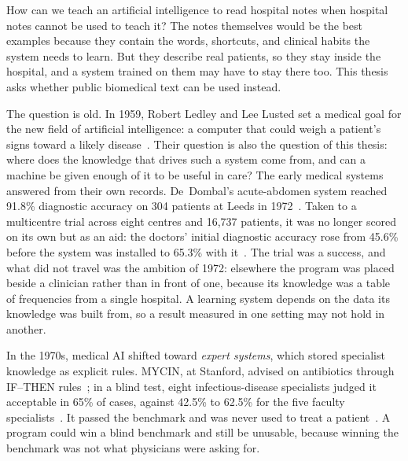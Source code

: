 

\noindent How can we teach an artificial intelligence to read hospital notes when hospital
notes cannot be used to teach it? The notes themselves would be
the best examples because they contain the words, shortcuts, and clinical habits
the system needs to learn. But they describe real patients, so they stay inside
the hospital, and a system trained on them may have to stay there too. This
thesis asks whether public biomedical text can be used instead.

The question is old. In 1959, Robert Ledley and Lee Lusted set a medical goal for
the new field of artificial intelligence: a computer that could weigh a patient's
signs toward a likely disease~\citep{ledley_lusted_1959}.
Their question is also
the question of this thesis: where does the knowledge that drives such a system
come from, and can a machine be given enough of it to be useful in care? The early
medical systems answered from their own records. De~Dombal's acute-abdomen system
reached 91.8\% diagnostic accuracy on 304 patients at Leeds in
1972~\citep{dedombal_1972}. Taken to a multicentre trial across eight centres and
16{,}737 patients, it was no longer scored on its own but as an aid: the doctors'
initial diagnostic accuracy rose from 45.6\% before the system was installed to
65.3\% with it~\citep{adams_1986}. The trial was a success, and what did not travel
was the ambition of 1972: elsewhere the program was placed beside a clinician
rather than in front of one, because its knowledge was a table of frequencies from
a single hospital. A learning system depends on the data
its knowledge was built from, so a result measured in one setting may not hold in
another.

In the 1970s, medical AI shifted toward \emph{expert systems}, which stored
specialist knowledge as explicit rules. MYCIN, at Stanford, advised on antibiotics
through IF--THEN rules~\citep{mycin_1975}; in a blind test, eight infectious-disease
specialists judged it acceptable in 65\% of cases, against 42.5\% to 62.5\% for the
five faculty specialists~\citep{mycin_eval_1979}. It passed the benchmark and was never used to treat a
patient~\citep{internist1_1982}. A program could win a blind benchmark and still be
unusable, because winning the benchmark was not what physicians were asking for.

